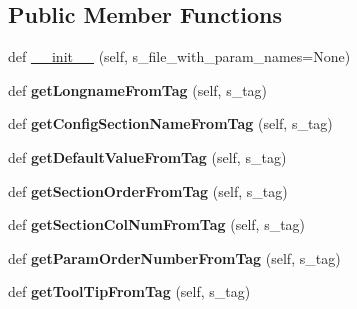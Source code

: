 \subsection*{Public Member Functions}
\begin{DoxyCompactItemize}
\item 
def \hyperlink{classnegui_1_1pgparamset_1_1PGParamSet_a598ea6a166f56fe5be01f86d4d8c91ba}{\+\_\+\+\_\+init\+\_\+\+\_\+} (self, s\+\_\+file\+\_\+with\+\_\+param\+\_\+names=None)
\item 
def {\bfseries get\+Longname\+From\+Tag} (self, s\+\_\+tag)\hypertarget{classnegui_1_1pgparamset_1_1PGParamSet_acc6d8437970d94eed41e05c7bb00d2ca}{}\label{classnegui_1_1pgparamset_1_1PGParamSet_acc6d8437970d94eed41e05c7bb00d2ca}

\item 
def {\bfseries get\+Config\+Section\+Name\+From\+Tag} (self, s\+\_\+tag)\hypertarget{classnegui_1_1pgparamset_1_1PGParamSet_a03c4b8dd0c3728cdcb7bf02ca0e673cb}{}\label{classnegui_1_1pgparamset_1_1PGParamSet_a03c4b8dd0c3728cdcb7bf02ca0e673cb}

\item 
def {\bfseries get\+Default\+Value\+From\+Tag} (self, s\+\_\+tag)\hypertarget{classnegui_1_1pgparamset_1_1PGParamSet_ade081db3140f50468abf16d320b76a12}{}\label{classnegui_1_1pgparamset_1_1PGParamSet_ade081db3140f50468abf16d320b76a12}

\item 
def {\bfseries get\+Section\+Order\+From\+Tag} (self, s\+\_\+tag)\hypertarget{classnegui_1_1pgparamset_1_1PGParamSet_a2bf1131707ba0e0cfa4c2d17e4d76ba4}{}\label{classnegui_1_1pgparamset_1_1PGParamSet_a2bf1131707ba0e0cfa4c2d17e4d76ba4}

\item 
def {\bfseries get\+Section\+Col\+Num\+From\+Tag} (self, s\+\_\+tag)\hypertarget{classnegui_1_1pgparamset_1_1PGParamSet_ae6e2a60dde8d9152b17e7a7d9ecbed59}{}\label{classnegui_1_1pgparamset_1_1PGParamSet_ae6e2a60dde8d9152b17e7a7d9ecbed59}

\item 
def {\bfseries get\+Param\+Order\+Number\+From\+Tag} (self, s\+\_\+tag)\hypertarget{classnegui_1_1pgparamset_1_1PGParamSet_a24d65e7f2a64e79820c04767de1895ca}{}\label{classnegui_1_1pgparamset_1_1PGParamSet_a24d65e7f2a64e79820c04767de1895ca}

\item 
def {\bfseries get\+Tool\+Tip\+From\+Tag} (self, s\+\_\+tag)\hypertarget{classnegui_1_1pgparamset_1_1PGParamSet_afd0f17941dc1e421f299c751266b3bb0}{}\label{classnegui_1_1pgparamset_1_1PGParamSet_afd0f17941dc1e421f299c751266b3bb0}


\end{DoxyCompactItemize}
